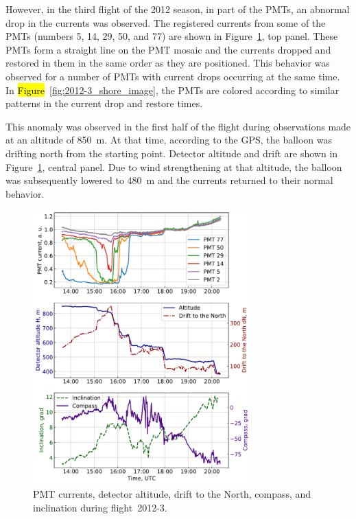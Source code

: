 \documentclass[universe,article,accept,moreauthors,pdftex]{Definitions/mdpi}
\begin{document}


However, in the third flight of the 2012 season, in part of the PMTs, an abnormal drop in the currents was observed. The registered currents from some of the PMTs (numbers 5, 14, 29, 50, and 77) are shown in Figure~\ref{fig:2012-3_currents}, top panel. These PMTs form a straight line on the PMT mosaic and the currents dropped and restored in them in the same order as they are positioned. This behavior was observed for a number of PMTs with current drops occurring at the same time. In \hl{Figure}~\ref{fig:2012-3_shore_image}, the PMTs are colored according to similar patterns in the current drop and restore times.%


       

This anomaly was observed in the first half of the flight during observations made at an altitude of 850~m. At that time, according to the GPS, the balloon was drifting north from the starting point. Detector altitude and drift are shown in Figure~\ref{fig:2012-3_currents}, central panel. Due to wind strengthening at that altitude, the balloon was subsequently lowered to 480~m and the currents returned to their normal behavior. 
\begin{figure}[H]
        \includegraphics[width=0.75\textwidth]{2012-3_currents_H_dN.pdf}
        \caption{PMT currents, detector altitude, drift to the North, compass, and inclination during flight~2012-3.}
        \label{fig:2012-3_currents}
\end{figure}
\end{document}
